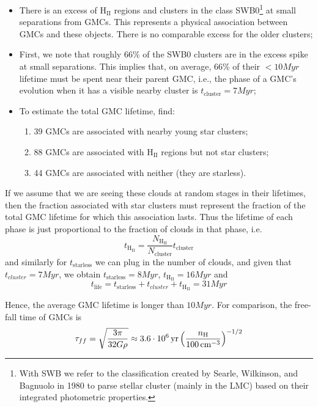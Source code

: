 \begin{itemize}
    \item There is an excess of H$_{\text{II}}$ regions and clusters in the class SWB0\footnote{With SWB we refer to the classification created by Searle, Wilkinson, and Bagnuolo in 1980 to parse stellar cluster (mainly in the LMC) based on their integrated photometric properties.} at small separations from GMCs. This represents a physical association between GMCs and these objects. There is no comparable excess for the older clusters;
    \item First, we note that roughly 66\% of the SWB0 clusters are in the excess spike at small separations. This implies that, on average, 66\% of their $<10\unit{Myr}$ lifetime must be spent near their parent GMC, i.e., the phase of a GMC’s evolution when it has a visible nearby cluster is $t_{\text{cluster}} = 7\unit{Myr}$;
    \item To estimate the total GMC lifetime, \cite{Kawamura_2009} find:
    \begin{enumerate}
        \item 39 GMCs are associated with nearby young star clusters;
        \item 88 GMCs are associated with H$_{\text{II}}$ regions but not star clusters;
        \item 44 GMCs are associated with neither (they are starless).
    \end{enumerate}
\end{itemize}
\par If we assume that we are seeing these clouds at random stages in their lifetimes, then the fraction associated with star clusters must represent the fraction of the total GMC lifetime for which this association lasts. Thus the lifetime of each phase is just proportional to the fraction of clouds in that phase, i.e.
\begin{equation*}
    t_{\text{H}_{\text{II}}} = \frac{N_{\text{H}_{\text{II}}}}{N_{\text{cluster}}}t_{\text{cluster}}
\end{equation*}
and similarly for $t_{\text{starless}}$ we can plug in the number of clouds, and given that $t_{cluster} = 7\unit{Myr}$, we obtain $t_{\text{starless}} = 8\unit{Myr}$, $ t_{\text{H}_{\text{II}}} = 16\unit{Myr}$ and $$t_{\text{life}} = t_{\text{starless}}+t_{cluster}+t_{\text{H}_{\text{II}}} = 31\unit{Myr}$$
\par Hence, the average GMC lifetime is longer than $10\unit{Myr}$. For comparison, the free-fall time of GMCs is
\begin{equation*}
    \tau_{ff} = \sqrt{\frac{3\pi}{32G \rho}} \approx 3.6\cdot 10^{6}\,\text{yr}\left(\frac{n_{\text{H}}}{100\,\text{cm}^{-3}}\right)^{-1/2}
\end{equation*}
